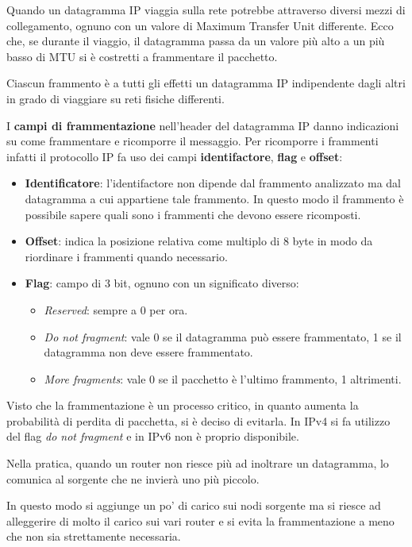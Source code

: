 Quando un datagramma IP viaggia sulla rete potrebbe attraverso diversi 
mezzi di collegamento, ognuno con un valore di Maximum Transfer Unit
differente. Ecco che, se durante il viaggio, il datagramma passa da un
valore più alto a un più basso di MTU si è costretti a frammentare il
pacchetto.

Ciascun frammento è a tutti gli effetti un datagramma IP indipendente
dagli altri in grado di viaggiare su reti fisiche differenti.

I \textbf{campi di frammentazione} nell'header del datagramma IP danno 
indicazioni su come frammentare e ricomporre il messaggio. Per
ricomporre i frammenti infatti il protocollo IP fa uso dei campi 
\textbf{identifactore}, \textbf{flag} e \textbf{offset}:
\begin{itemize}
	\item \textbf{Identificatore}: l'identifactore non dipende dal 
		frammento analizzato ma dal datagramma a cui appartiene tale
		frammento. In questo modo il frammento è possibile sapere quali
		sono i frammenti che devono essere ricomposti.
	\item \textbf{Offset}: indica la posizione relativa come multiplo 
		di 8 byte in modo da riordinare i frammenti quando necessario.
	\item \textbf{Flag}: campo di 3 bit, ognuno con un significato
		diverso:
		\begin{itemize}
			\item \emph{Reserved}: sempre a 0 per ora.
			\item \emph{Do not fragment}: vale 0 se il datagramma può 
				essere frammentato, 1 se il datagramma non deve essere
				frammentato.
			\item \emph{More fragments}: vale 0 se il pacchetto è
				l'ultimo frammento, 1 altrimenti.
		\end{itemize}
\end{itemize}
Visto che la frammentazione è un processo critico, in quanto aumenta 
la probabilità di perdita di pacchetta, si è deciso di evitarla. In
IPv4 si fa utilizzo del flag \emph{do not fragment} e in IPv6 non è
proprio disponibile.

Nella pratica, quando un router non riesce più ad inoltrare un 
datagramma, lo comunica al sorgente che ne invierà uno più piccolo.

In questo modo si aggiunge un po' di carico sui nodi sorgente ma si
riesce ad alleggerire di molto il carico sui vari router e si evita 
la frammentazione a meno che non sia strettamente necessaria.

